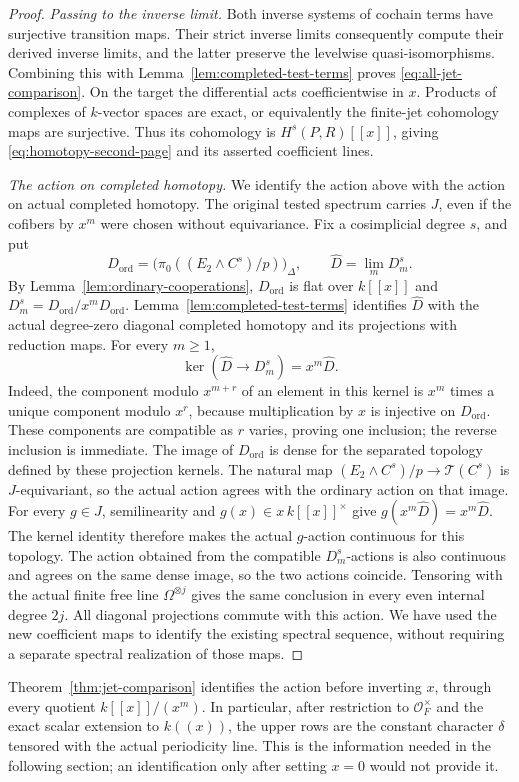\begin{proof}
\smallskip\noindent\emph{Passing to the inverse limit.}
Both inverse systems of cochain terms have surjective transition
maps.  Their strict inverse limits consequently compute their
derived inverse limits, and the latter preserve the levelwise
quasi-isomorphisms.  Combining this with
Lemma~\ref{lem:completed-test-terms} proves
\eqref{eq:all-jet-comparison}.  On the target the differential acts
coefficientwise in $x$.  Products of complexes of $k$-vector spaces
are exact, or equivalently the finite-jet cohomology maps are
surjective.  Thus its cohomology is $H^s(P,R)[[x]]$, giving
\eqref{eq:homotopy-second-page} and its asserted coefficient lines.

\smallskip\noindent\emph{The action on completed homotopy.}
We identify the action above with the action on actual completed homotopy.
The original tested spectrum carries $J$, even if the cofibers by $x^m$
were chosen without equivariance. Fix a cosimplicial degree $s$, and put
\[
 D_{\mathrm{ord}}=
   \bigl(\pi_0((E_2\wedge C^s)/p)\bigr)_\Delta,
 \qquad \widehat D=\lim_m D_m^s.
\]
By Lemma~\ref{lem:ordinary-cooperations}, $D_{\mathrm{ord}}$ is flat over
$k[[x]]$ and $D_m^s=D_{\mathrm{ord}}/x^mD_{\mathrm{ord}}$.
Lemma~\ref{lem:completed-test-terms} identifies $\widehat D$ with the
actual degree-zero diagonal completed homotopy and its projections with
reduction maps. For every $m\geq1$,
\[
 \ker(\widehat D\longrightarrow D_m^s)=x^m\widehat D.
\]
Indeed, the component modulo $x^{m+r}$ of an element in this kernel is
$x^m$ times a unique component modulo $x^r$, because multiplication by $x$ is injective on
$D_{\mathrm{ord}}$. These components are compatible as $r$ varies,
proving one inclusion; the reverse inclusion is immediate. The image of $D_{\mathrm{ord}}$ is
dense for the separated topology defined by these projection kernels.
The natural map $(E_2\wedge C^s)/p\to\mathcal T(C^s)$ is $J$-equivariant,
so the actual action agrees with the ordinary action on that image.
For every $g\in J$, semilinearity and $g(x)\in x\,k[[x]]^\times$ give
$g(x^m\widehat D)=x^m\widehat D$. The kernel identity therefore makes
the actual $g$-action continuous for this topology. The action obtained from the
compatible $D_m^s$-actions is also continuous and agrees on the same
dense image, so the two actions coincide. Tensoring with the actual
finite free line $\Omega^{\otimes j}$ gives the same conclusion in every
even internal degree $2j$. All diagonal projections commute with this
action. We have used the new coefficient maps to identify the existing
spectral sequence, without requiring a separate spectral realization
of those maps.
\end{proof}

\begin{remark}\label{rem:why-all-jets}
Theorem~\ref{thm:jet-comparison} identifies the action before
inverting $x$, through every quotient $k[[x]]/(x^m)$.  In particular,
after restriction to $\mathcal O_F^\times$ and the exact scalar
extension to $k((x))$, the upper rows are the
constant character $\delta$ tensored with the actual periodicity
line.  This is the information needed in the following section;
an identification only after setting $x=0$ would not provide it.
\end{remark}
